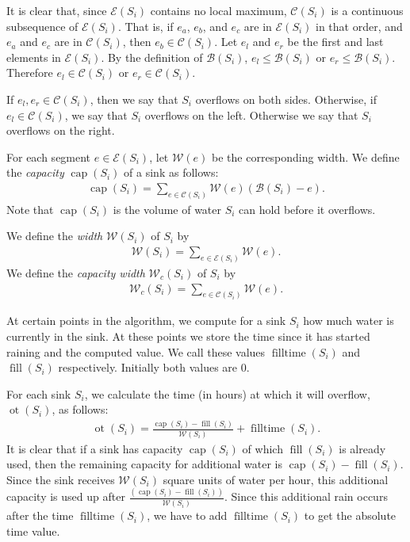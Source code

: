 \documentclass[11pt,a4paper]{article}
\DeclareMathOperator{\capp}{cap}
\DeclareMathOperator{\ot}{ot}
\DeclareMathOperator{\Fill}{fill}
\DeclareMathOperator{\filltime}{filltime}
\begin{document}
It is clear that, since $\mathcal{E}(S_i)$ contains no local maximum, $\mathcal{C}(S_i)$ is a continuous subsequence of $\mathcal{E}(S_i)$.
That is, if $e_a$, $e_b$, and $e_c$ are in $\mathcal{E}(S_i)$ in that order, and $e_a$ and $e_c$ are in $\mathcal{C}(S_i)$, then $e_b\in\mathcal{C}(S_i)$.
Let $e_l$ and $e_r$ be the first and last elements in $\mathcal{E}(S_i)$.
By the definition of $\mathcal{B}(S_i)$, $e_l\le\mathcal{B}(S_i)$ or $e_r\le\mathcal{B}(S_i)$.
Therefore $e_l\in\mathcal{C}(S_i)$ or $e_r\in\mathcal{C}(S_i)$.

If $e_l,e_r\in\mathcal{C}(S_i)$, then we say that $S_i$ overflows on both sides.
Otherwise, if $e_l\in\mathcal{C}(S_i)$, we say that $S_i$ overflows on the left.
Otherwise we say that $S_i$ overflows on the right.

For each segment $e\in\mathcal{E}(S_i)$, let $\mathcal{W}(e)$ be the corresponding width.
We define the \textit{capacity} $\capp(S_i)$ of a sink as follows:
\begin{align*}
    \capp(S_i) = \sum_{e\in\mathcal{C}(S_i)} \mathcal{W}(e)(\mathcal{B}(S_i)-e).
\end{align*}
Note that $\capp(S_i)$ is the volume of water $S_i$ can hold before it overflows.

We define the \textit{width} $\mathcal{W}(S_i)$ of $S_i$ by
\begin{align*}
    \mathcal{W}(S_i) = \sum_{e\in\mathcal{E}(S_i)} \mathcal{W}(e).
\end{align*}
We define the \textit{capacity width} $\mathcal{W}_c(S_i)$ of $S_i$ by
\begin{align*}
    \mathcal{W}_c(S_i) = \sum_{e\in\mathcal{C}(S_i)} \mathcal{W}(e).
\end{align*}

At certain points in the algorithm, we compute for a sink $S_i$ how much water is currently in the sink.
At these points we store the time since it has started raining and the computed value.
We call these values $\filltime(S_i)$ and $\Fill(S_i)$ respectively.
Initially both values are $0$.

For each sink $S_i$, we calculate the time (in hours) at which it will overflow, $\ot(S_i)$, as follows:
\begin{align*}
    \ot(S_i) = \frac{\capp(S_i) - \Fill(S_i)}{\mathcal{W}(S_i)} + \filltime(S_i).
\end{align*}
It is clear that if a sink has capacity $\capp(S_i)$ of which $\Fill(S_i)$ is already used, then the remaining capacity for additional water is $\capp(S_i) - \Fill(S_i)$.
Since the sink receives $\mathcal{W}(S_i)$ square units of water per hour, this additional capacity is used up after $\frac{(\capp(S_i) - \Fill(S_i))}{\mathcal{W}(S_i)}$.
Since this additional rain occurs after the time $\filltime(S_i)$, we have to add $\filltime(S_i)$ to get the absolute time value.
\end{document}
